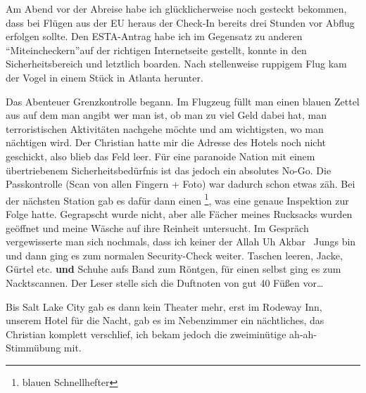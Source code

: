 Am Abend vor der Abreise habe ich glücklicherweise noch gesteckt bekommen, dass bei Flügen aus der EU heraus der Check-In bereits drei Stunden vor Abflug erfolgen sollte.
Den ESTA-Antrag habe ich \textendash im Gegensatz zu anderen \textquotedblleft Mit\-ein\-checkern\textquotedblright \textendash auf der richtigen Internetseite gestellt, konnte in den Sicherheitsbereich und letztlich boarden.
Nach stellenweise ruppigem Flug kam der Vogel in einem Stück in Atlanta herunter.

Das Abenteuer Grenzkontrolle begann.
Im Flugzeug füllt man einen blauen Zettel aus auf dem man angibt wer man ist, ob man zu viel Geld dabei hat, man terroristischen Aktivitäten nachgehe möchte und am wichtigsten, wo man nächtigen wird.
Der Christian hatte mir die Adresse des Hotels noch nicht geschickt, also blieb das Feld leer.
Für eine paranoide Nation mit einem übertriebenem Sicherheitsbedürfnis ist das jedoch ein absolutes No-Go.
Die Passkontrolle (Scan von allen Fingern + Foto) war dadurch schon etwas zäh.
Bei der nächsten Station gab es dafür dann einen \footnote{blauen Schnellhefter}, was eine genaue Inspektion zur Folge hatte.
Gegrapscht wurde nicht, aber alle Fächer meines Rucksacks wurden geöffnet und meine Wäsche auf ihre Reinheit untersucht.
Im Gespräch vergewisserte man sich nochmals, dass ich keiner der \glqq Allah Uh Akbar \grqq\, Jungs bin und dann ging es zum normalen Security-Check weiter.
Taschen leeren, Jacke, Gürtel etc. \textbf{und} Schuhe aufs Band zum Röntgen, für einen selbst ging es zum Nacktscannen.
Der Leser stelle sich die Duftnoten von gut 40 Füßen vor\dots

Bis Salt Lake City gab es dann kein Theater mehr, erst im Rodeway Inn, unserem Hotel für die Nacht, gab es im Nebenzimmer ein nächtliches, das Christian komplett verschlief, ich bekam jedoch die zweiminütige ah-ah-Stimmübung mit.
